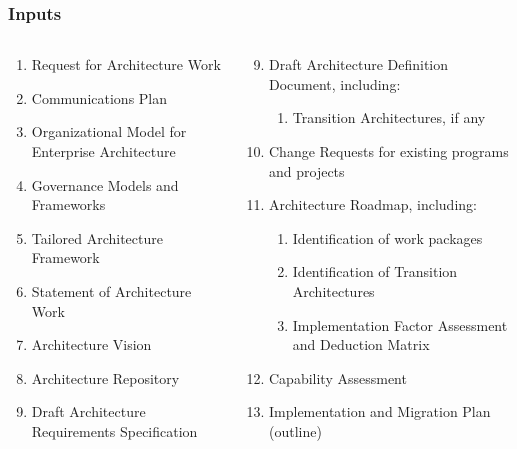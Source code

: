 \documentclass[aspectratio=169, table]{beamer}
\begin{document}
	\begin{frame}
		\frametitle{Inputs}
		\vspace{22pt}
		\begin{columns}[onlytextwidth]
			\begin{column}{0.45\textwidth}
				\begin{enumerate}
					\item Request for Architecture Work
					\item Communications Plan
					\item Organizational Model for Enterprise Architecture
					\item Governance Models and Frameworks
					\item Tailored Architecture Framework
					\item Statement of Architecture Work
					\item Architecture Vision
					\item Architecture Repository
					\item Draft Architecture Requirements Specification
				\end{enumerate}

			\end{column}
			\begin{column}{0.55\textwidth}
				\begin{enumerate}
					\setcounter{enumi}{8}
					\item Draft Architecture Definition Document, including:
					\begin{enumerate}
						\item Transition Architectures, if any
					\end{enumerate}
					\item Change Requests for existing programs and projects
					\item Architecture Roadmap, including:
					\begin{enumerate}
						\item Identification of work packages
						\item Identification of Transition Architectures
						\item Implementation Factor Assessment and Deduction Matrix
					\end{enumerate}
					\item Capability Assessment
					\item Implementation and Migration Plan (outline)
				\end{enumerate}
			\end{column}
		\end{columns}
	\end{frame}
\end{document}
